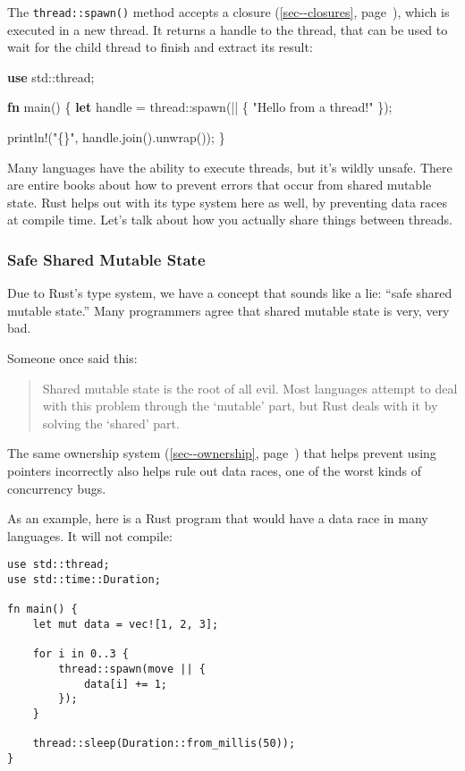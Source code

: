 \documentclass[a4paper,]{book}
\renewcommand*{\hyperref}[2][\ar]{%
  \def\ar{#2}%
  #2 (\autoref{#1}, page~\pageref{#1})}
\newenvironment{Shaded}{\begin{snugshade}}{\end{snugshade}}
\newcommand{\KeywordTok}[1]{\textcolor[rgb]{0.13,0.29,0.53}{\textbf{{#1}}}}
\newcommand{\StringTok}[1]{\textcolor[rgb]{0.31,0.60,0.02}{{#1}}}
\newcommand{\OtherTok}[1]{\textcolor[rgb]{0.56,0.35,0.01}{{#1}}}
\newcommand{\NormalTok}[1]{{#1}}
\begin{document}
The \texttt{thread::spawn()} method accepts a
\hyperref[sec--closures]{closure}, which is executed in a new thread. It
returns a handle to the thread, that can be used to wait for the child
thread to finish and extract its result:

\begin{Shaded}
\begin{Highlighting}[]
\KeywordTok{use} \NormalTok{std::thread;}

\KeywordTok{fn} \NormalTok{main() \{}
    \KeywordTok{let} \NormalTok{handle = thread::spawn(|| \{}
        \StringTok{"Hello from a thread!"}
    \NormalTok{\});}

    \OtherTok{println!}\NormalTok{(}\StringTok{"\{\}"}\NormalTok{, handle.join().unwrap());}
\NormalTok{\}}
\end{Highlighting}
\end{Shaded}

Many languages have the ability to execute threads, but it's wildly
unsafe. There are entire books about how to prevent errors that occur
from shared mutable state. Rust helps out with its type system here as
well, by preventing data races at compile time. Let's talk about how you
actually share things between threads.

\subsubsection{Safe Shared Mutable
State}\label{safe-shared-mutable-state}

Due to Rust's type system, we have a concept that sounds like a lie:
``safe shared mutable state.'' Many programmers agree that shared
mutable state is very, very bad.

Someone once said this:

\begin{quote}
Shared mutable state is the root of all evil. Most languages attempt to
deal with this problem through the `mutable' part, but Rust deals with
it by solving the `shared' part.
\end{quote}

The same \hyperref[sec--ownership]{ownership system} that helps prevent
using pointers incorrectly also helps rule out data races, one of the
worst kinds of concurrency bugs.

As an example, here is a Rust program that would have a data race in
many languages. It will not compile:

\begin{verbatim}
use std::thread;
use std::time::Duration;

fn main() {
    let mut data = vec![1, 2, 3];

    for i in 0..3 {
        thread::spawn(move || {
            data[i] += 1;
        });
    }

    thread::sleep(Duration::from_millis(50));
}
\end{verbatim}
\end{document}
